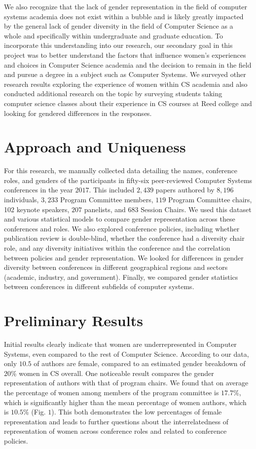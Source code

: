 \documentclass{sig-alternate-05-2015}
\begin{document}
 We also recognize that the lack of gender representation in the field of computer systems academia does not exist within a bubble and is likely greatly impacted by the general lack of gender diversity in the field of Computer Science as a whole and specifically within undergraduate and graduate education. To incorporate this understanding into our research, our secondary goal in this project was to better understand the factors that influence women’s experiences and choices in Computer Science academia and the decision to remain in the field and pursue a degree in a subject such as Computer Systems. We surveyed other research results exploring the experience of women within CS academia and also conducted additional research on the topic by surveying students taking computer science classes about their experience in CS courses at Reed college and looking for gendered differences in the responses.

\section{Approach and Uniqueness}
For this research, we manually collected data detailing the names, conference roles, and genders of the participants in fifty-six peer-reviewed Computer Systems conferences  in the year $2017$. This included $2,439$ papers authored by $8,196$ individuals, $3,233$ Program Committee members, $119$ Program Committee chairs, 102 keynote speakers, $207$ panelists, and $683$ Session Chairs. We used this dataset and various statistical models to compare gender representation across these conferences and roles. We also explored conference policies, including whether publication review is double-blind, whether the conference had a diversity chair role, and any diversity initiatives within the conference and the correlation between policies and gender representation. We looked for differences in gender diversity between conferences in different geographical regions and sectors (academic, industry, and government). Finally, we compared gender statistics between conferences in different subfields of computer systems. 

\section{Preliminary Results}
Initial results clearly indicate that women are underrepresented in Computer Systems, even compared to the rest of Computer Science. According to our data, only $10.5$ of authors are female, compared to an estimated gender breakdown of $20$\% women in CS overall. One noticeable result compares the gender representation of authors with that of program chairs. We found that on average the percentage of women among members of the program committee is $17.7$\%, which is significantly higher than the mean percentage of women authors, which is $10.5$\% (Fig. $1$). This both demonstrates the low percentages of female representation and leads to further questions about the interrelatedness of representation of women across conference roles and related to conference policies. 
\end{document}
